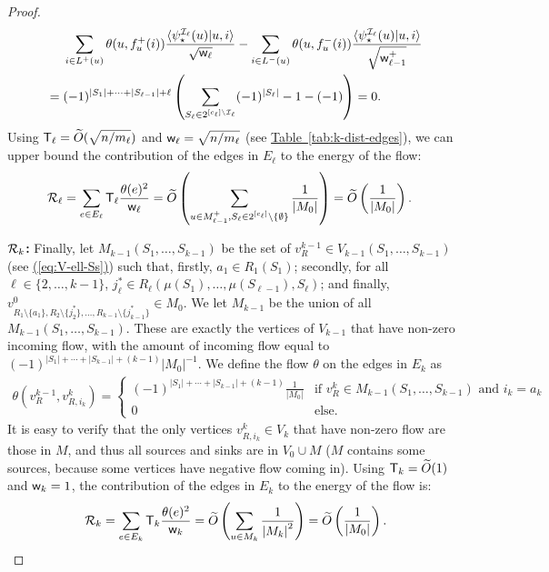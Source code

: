 \documentclass{theoretics}
\newcommand{\eq}[1]{\hyperref[eq:#1]{(\ref*{eq:#1})}}
\newcommand{\tabl}[1]{\hyperref[tab:#1]{Table~\ref*{tab:#1}}}
\renewcommand{\>}{\rangle}
\newcommand{\<}{\langle}
\renewcommand{\(}{\left(}
\renewcommand{\)}{\right)}
\def\braket#1#2{{{\langle}#1\vert}#2\rangle}
\def\abs#1{\left| #1 \right|}
\def\w{{\sf w}}
\begin{document}
\begin{proof}
\begin{align*}
			&\sum_{i\in L^+(u)}\theta(u,f^+_{u}(i))\frac{\braket{\psi_\star^{{\cal I}_{\ell}}(u)}{u,i}}{\sqrt{\w_{\ell}}}-\sum_{i\in L^-(u)}\theta(u,f^- _{u}(i))\frac{\braket{\psi_\star^{{\cal I}_{\ell}}(u)}{u,i}}{\sqrt{\w_{\ell-1}^+}}\\
			={}& (-1)^{|S_1|+\dots+|S_{\ell-1}|+{\ell}}\left(\sum_{S_\ell\in 2^{[c_{\ell}]\setminus{\cal I}_{\ell}}}(-1)^{|S_{\ell}|}-1-(-1)\right)=0.
		\end{align*}
Using ${\sf T}_{\ell}=\widetilde{O}(\sqrt{n/m_{\ell}})$ and $\w_{\ell}=\sqrt{n/m_{\ell}}$ (see \tabl{k-dist-edges}), we can upper bound the contribution of the edges in $E_{\ell}$ to the energy of the flow:
\begin{equation}
\begin{split}
			{\cal R}_{\ell} &= \sum_{e\in E_{\ell}}{\sf T}_{\ell}\frac{\theta(e)^2}{\w_{\ell}} = \widetilde{O}\left(\sum_{\substack{u \in M_{\ell-1}^+, S_{\ell} \in 2^{[c_{\ell}]} \setminus \{\emptyset\}}}\frac{1}{\abs{M_0}}\right)=\widetilde{O}\left(\frac{1}{\abs{M_0}}\right).
\end{split}\label{eq:k-Rell}
\end{equation}
	
\vskip7pt	
\noindent\textbf{${\cal R}_{k}$:} Finally, let $M_{k-1}(S_1,\dots,S_{k-1})$ be the set of $v^{k-1}_{R}\in V_{k-1}(S_1,\dots,S_{k-1})$ (see \eq{V-ell-Ss}) such that, firstly, 
$a_1\in R_1(S_1)$; secondly, for all $\ell\in\{2,\dots,k-1\}$, $j_{\ell}^*\in R_{\ell}(\mu(S_1),\dots,\mu(S_{\ell-1}),S_{\ell})$; and finally,
$v^{0}_{R_1\setminus\{a_1\},R_2\setminus\{j_2^*\},\dots,R_{k-1}\setminus\{j_{k-1}^*\}}\in M_0.$
We let $M_{k-1}$ be the union of all $M_{k-1}(S_1,\dots,S_{k-1})$.
These are exactly the vertices of $V_{k-1}$ that have non-zero incoming flow, with the amount of incoming flow equal to $(-1)^{\abs{S_1} + \cdots +\abs{S_{k-1}}+(k-1)}{\abs{M_0}}^{-1}$. We define the flow $\theta$ on the edges in $E_{k}$ as 
		\begin{align*} 
			\theta(v^{k-1}_{R},v^k_{R,i_{k}})= \begin{cases}
				\left(-1\right)^{\abs{S_1} + \cdots + \abs{S_{k-1}}+\left(k-1\right)}\frac{1}{\abs{M_0}} &\text{if } v^k_R \in M_{k-1}(S_1,\dots,S_{k-1})\text{ and } i_{k} = a_k\\
				0 &\text{else}.
			\end{cases}
		\end{align*}
It is easy to verify that the only vertices $v^k_{R,i_k}\in V_k$ that have non-zero flow are those in $M$, and thus all sources and sinks are in $V_0\cup M$ ($M$ contains some sources, because some vertices have negative flow coming in). Using ${\sf T}_k=\widetilde{O}(1)$ and $\w_k=1$, the contribution of the edges in $E_k$ to the energy of the flow is:
\begin{equation}
			{\cal R}_k = \sum_{e\in E_k}{\sf T}_k\frac{\theta(e)^2}{\w_k} = \widetilde{O}\left(\sum_{u\in M_k}\frac{1}{\abs{M_k}^2}\right)=\widetilde{O}\left(\frac{1}{\abs{M_0}}\right)\label{eq:k-Rk}.
		\end{equation}


\end{proof}
\end{document}
